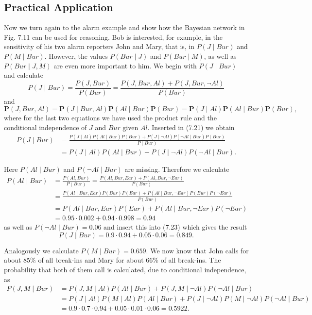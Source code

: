 \documentclass[10pt]{book}
\begin{document}
\subsection{Practical Application}
Now we turn again to the alarm example and show how the Bayesian network in Fig. 7.11 can be used for reasoning. Bob is interested, for example, in the sensitivity of his two alarm reporters John and Mary, that is, in $P(J \mid Bur)$ and $P(M \mid Bur)$. However, the values $P(Bur \mid J)$ and $P(Bur \mid M)$, as well as $P(Bur \mid J, M)$ are even more important to him. We begin with $P(J \mid Bur)$ and calculate
\begin{equation*}
P(J \mid Bur)=\frac{P(J, Bur)}{P(Bur)}=\frac{P(J, Bur, Al)+P(J, Bur, \neg Al)}{P(Bur)} \tag{7.21}
\end{equation*}
and
\begin{equation*}
\boldsymbol{P}(J, Bur, Al)=\boldsymbol{P}(J \mid Bur, Al)\boldsymbol{P}(Al \mid Bur)\boldsymbol{P}(Bur)=\boldsymbol{P}(J \mid Al)\boldsymbol{P}(Al \mid Bur)\boldsymbol{P}(Bur), \tag{7.22}
\end{equation*}
where for the last two equations we have used the product rule and the conditional independence of $J$ and $Bur$ given $Al$. Inserted in (7.21) we obtain
\begin{align*}
P(J \mid Bur) & =\frac{P(J \mid Al)P(Al \mid Bur)P(Bur)+P(J \mid \neg Al)P(\neg Al \mid Bur)P(Bur)}{P(Bur)} \tag{7.23}\\
& =P(J \mid Al)P(Al \mid Bur)+P(J \mid \neg Al)P(\neg Al \mid Bur).
\end{align*}

Here $P(Al \mid Bur)$ and $P(\neg Al \mid Bur)$ are missing. Therefore we calculate
$$
\begin{aligned}
P(Al \mid Bur) & =\frac{P(Al, Bur)}{P(Bur)}=\frac{P(Al, Bur, Ear)+P(Al, Bur, \neg Ear)}{P(Bur)} \\
& =\frac{P(Al \mid Bur, Ear)P(Bur)P(Ear)+P(Al \mid Bur, \neg Ear)P(Bur)P(\neg Ear)}{P(Bur)} \\
& =P(Al \mid Bur, Ear)P(Ear)+P(Al \mid Bur, \neg Ear)P(\neg Ear) \\
& =0.95 \cdot 0.002+0.94 \cdot 0.998=0.94
\end{aligned}
$$
as well as $P(\neg Al \mid Bur)=0.06$ and insert this into (7.23) which gives the result
$$
P(J \mid Bur)=0.9 \cdot 0.94+0.05 \cdot 0.06=0.849.
$$

Analogously we calculate $P(M \mid Bur)=0.659$. We now know that John calls for about $85 \%$ of all break-ins and Mary for about $66 \%$ of all break-ins. The probability that both of them call is calculated, due to conditional independence, as
$$
\begin{aligned}
P(J, M \mid Bur) & =P(J, M \mid Al)P(Al \mid Bur)+P(J, M \mid \neg Al)P(\neg Al \mid Bur) \\
& =P(J \mid Al)P(M \mid Al)P(Al \mid Bur)+P(J \mid \neg Al)P(M \mid \neg Al)P(\neg Al \mid Bur) \\
& =0.9 \cdot 0.7 \cdot 0.94+0.05 \cdot 0.01 \cdot 0.06=0.5922.
\end{aligned}
$$
\end{document}
